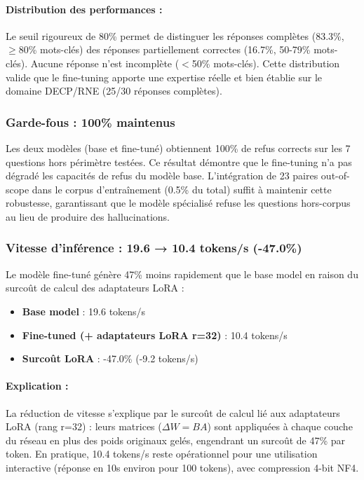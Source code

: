 \paragraph{Distribution des performances :}
Le seuil rigoureux de 80\% permet de distinguer les réponses complètes (83.3\%, $\geq$80\% mots-clés) des réponses partiellement correctes (16.7\%, 50-79\% mots-clés). Aucune réponse n'est incomplète ($<$50\% mots-clés). Cette distribution valide que le fine-tuning apporte une expertise réelle et bien établie sur le domaine DECP/RNE (25/30 réponses complètes).

\subsubsection{Garde-fous : 100\% maintenus}

Les deux modèles (base et fine-tuné) obtiennent 100\% de refus corrects sur les 7 questions hors périmètre testées. Ce résultat démontre que le fine-tuning n'a pas dégradé les capacités de refus du modèle base. L'intégration de 23 paires out-of-scope dans le corpus d'entraînement (0.5\% du total) suffit à maintenir cette robustesse, garantissant que le modèle spécialisé refuse les questions hors-corpus au lieu de produire des hallucinations.

\subsubsection{Vitesse d'inférence : 19.6 → 10.4 tokens/s (-47.0\%)}

Le modèle fine-tuné génère 47\% moins rapidement que le base model en raison du surcoût de calcul des adaptateurs LoRA :

\begin{itemize}
    \item \textbf{Base model} : 19.6 tokens/s
    \item \textbf{Fine-tuned (+ adaptateurs LoRA r=32)} : 10.4 tokens/s
    \item \textbf{Surcoût LoRA} : -47.0\% (-9.2 tokens/s)
\end{itemize}

\paragraph{Explication :}
La réduction de vitesse s'explique par le surcoût de calcul lié aux adaptateurs LoRA (rang r=32) : leurs matrices ($\Delta W = BA$) sont appliquées à chaque couche du réseau en plus des poids originaux gelés, engendrant un surcoût de 47\% par token. En pratique, 10.4 tokens/s reste opérationnel pour une utilisation interactive (réponse en 10s environ pour 100 tokens), avec compression 4-bit NF4.


